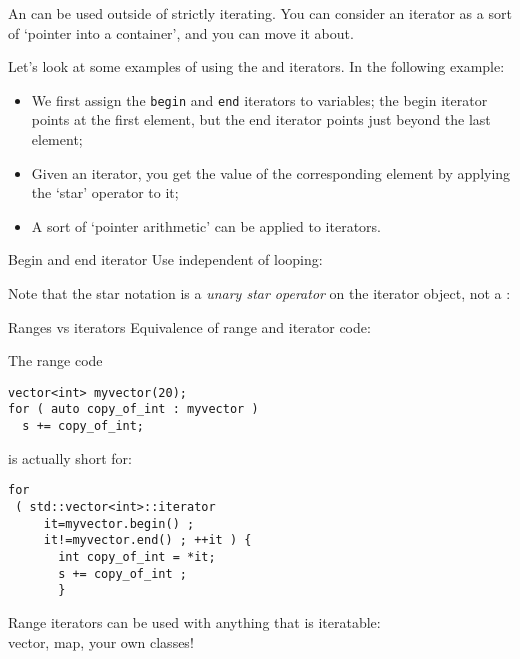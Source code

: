 An  can be used outside of strictly iterating.
You can consider an iterator as a sort of `pointer into a container',
and you can move it about.

Let's look at some examples of using
the  and  iterators.
In the following example:
\begin{itemize}
\item We first assign the \lstinline{begin} and \lstinline{end} iterators to variables;
  the begin iterator points at the first element,
  but the end iterator points just beyond the last element;
\item Given an iterator, you get the value of the corresponding element by
  applying the `star' operator to it;
\item A sort of `pointer arithmetic' can be applied to iterators.
\end{itemize}

\begin{block}{Begin and end iterator}
  \label{sl:vec-iterator}
  Use independent of looping:
\end{block}

Note that the star notation is a
\emph{unary star operator}
on the iterator object,
not a
:
%

\begin{block}{Ranges vs iterators}
  \label{sl:auto-iterator}
  Equivalence of range and iterator code:
  \begin{multicols}{2}
    The range code
\begin{lstlisting}
vector<int> myvector(20);
for ( auto copy_of_int : myvector )
  s += copy_of_int;
\end{lstlisting}
\columnbreak
    is actually short for:
\begin{lstlisting}
for
 ( std::vector<int>::iterator
     it=myvector.begin() ;
     it!=myvector.end() ; ++it ) {
       int copy_of_int = *it;
       s += copy_of_int ;
       }
\end{lstlisting}
  \end{multicols}
  Range iterators can be used with anything that is iteratable:\\
  vector, map, your own classes!
\end{block}


